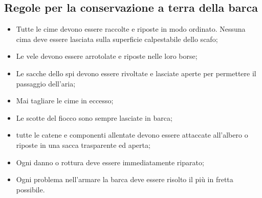 \subsection{Regole per la conservazione a terra della barca}
\label{sub:RegolePerLaConservazioneATerraDellaBarca}
\begin{itemize}
    \item Tutte le cime devono essere raccolte e riposte in modo ordinato.
          Nessuna cima deve essere lasciata sulla superficie calpestabile dello scafo;
    \item Le vele devono essere arrotolate e riposte nelle loro borse;
    \item Le sacche dello spi devono essere rivoltate e lasciate aperte per
          permettere il passaggio dell'aria;
    \item Mai tagliare le cime in eccesso;
    \item Le scotte del fiocco sono sempre lasciate in barca;
    \item tutte le catene e componenti allentate devono essere attaccate
          all'albero o riposte in una sacca trasparente ed aperta;
    \item Ogni danno o rottura deve essere immediatamente riparato;
    \item Ogni problema nell'armare la barca deve essere risolto il più in
          fretta possibile.
\end{itemize}